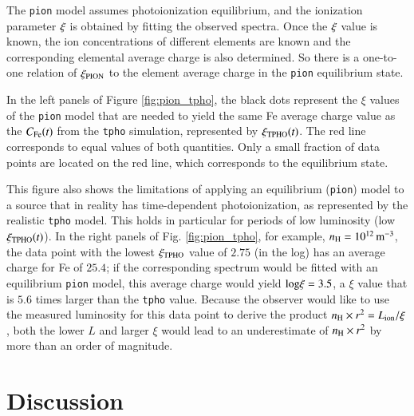 \documentclass{aa}
\begin{document}
The \texttt{pion} model assumes photoionization equilibrium, and the ionization parameter $\rm \xi$ is obtained by fitting the observed spectra.
Once the $\rm \xi$ value is known, the ion concentrations of different elements are known and the corresponding elemental average charge is also determined.
So there is a one-to-one relation of $\xi_{\rm PION}$ to the element average charge in the \texttt{pion} equilibrium state.


In the left panels of Figure \ref{fig:pion_tpho}, the black dots represent the $\xi$ values of the \texttt{pion} model that are needed to yield the same Fe average charge value as the $C_{\rm Fe}(t)$ from the \texttt{tpho} simulation, represented by $\xi_{\rm TPHO}(t)$. 
The red line corresponds to equal values of both quantities. 
Only a small fraction of data points are located on the red line, which corresponds to the equilibrium state.


This figure also shows the limitations of applying an equilibrium (\texttt{pion}) model to a source that in reality has time-dependent photoionization, as represented by the realistic \texttt{tpho} model.
This holds in particular for periods of low luminosity (low $\xi_{\rm TPHO}(t)$).
In the right panels of Fig. \ref{fig:pion_tpho}, for example, $n_{\rm H} = 10^{12} \, \rm m^{-3}$, the data point with the lowest $\xi_{\rm TPHO}$ value of $2.75$ (in the log) has an average charge for Fe of $25.4$; if the corresponding spectrum would be fitted with an equilibrium \texttt{pion} model, this average charge would yield $\rm log \xi = 3.5$, a $\xi$ value that is $5.6$ times larger than the \texttt{tpho} value.
Because the observer would like to use the measured luminosity for this data point to derive the product $n_{\rm H} \times r^2 = L_{\rm ion}/\xi$, both the lower $L$ and larger $\xi$ would lead to an underestimate of $n_{\rm H} \times r^2$ by more than an order of magnitude.










\section{Discussion}\label{sect:4}
\end{document}
